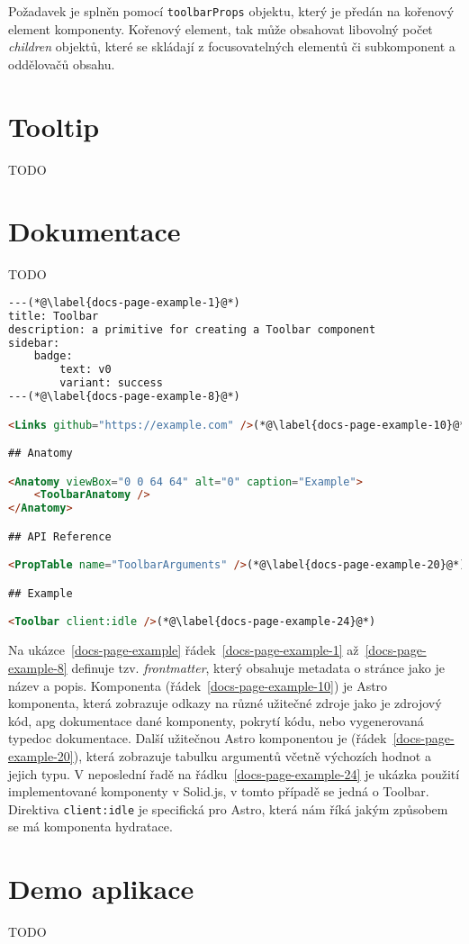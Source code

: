 Požadavek \hyperref[tfr11]{} je splněn pomocí \texttt{toolbarProps} objektu, který je předán na kořenový element komponenty.
Kořenový element, tak může obsahovat libovolný počet \textit{children} objektů, které se skládají z focusovatelných elementů či subkomponent a oddělovačů obsahu.

\clearpage

\section{Tooltip}

TODO


\section{Dokumentace}

TODO

\begin{lstlisting}[caption={Ukázka stránky dokumentace psané v MDX}, label={docs-page-example}, language=html]
---(*@\label{docs-page-example-1}@*)
title: Toolbar
description: a primitive for creating a Toolbar component
sidebar:
    badge:
        text: v0
        variant: success
---(*@\label{docs-page-example-8}@*)

<Links github="https://example.com" />(*@\label{docs-page-example-10}@*)

## Anatomy

<Anatomy viewBox="0 0 64 64" alt="0" caption="Example">
    <ToolbarAnatomy />
</Anatomy>

## API Reference

<PropTable name="ToolbarArguments" />(*@\label{docs-page-example-20}@*)

## Example

<Toolbar client:idle />(*@\label{docs-page-example-24}@*)
\end{lstlisting}

Na ukázce~\ref{docs-page-example} řádek~\ref{docs-page-example-1} až~\ref{docs-page-example-8} definuje tzv. \textit{frontmatter}, který obsahuje metadata o stránce jako je název a popis.
Komponenta  (řádek~\ref{docs-page-example-10}) je Astro komponenta, která zobrazuje odkazy na různé užitečné zdroje jako je zdrojový kód, \gls{apg} dokumentace dané komponenty, pokrytí kódu, nebo vygenerovaná typedoc dokumentace.
Další užitečnou Astro komponentou je  (řádek~\ref{docs-page-example-20}), která zobrazuje tabulku argumentů včetně výchozích hodnot a jejich typu.
V neposlední řadě na řádku~\ref{docs-page-example-24} je ukázka použití implementované komponenty v Solid.js, v tomto případě se jedná o Toolbar.
Direktiva \texttt{client:idle} je specifická pro Astro, která nám říká jakým způsobem se má komponenta \gls{hydratace}.

\section{Demo aplikace}

TODO
